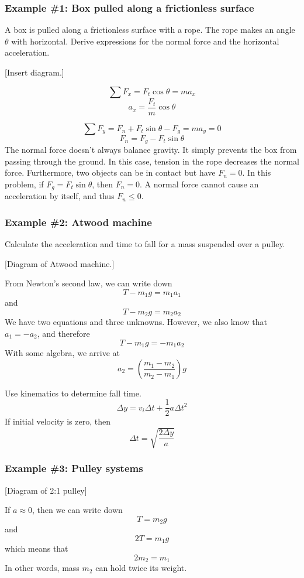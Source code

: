 \subsubsection*{Example \#1: Box pulled along a frictionless surface}
A box is pulled along a frictionless surface with a rope. The rope makes an angle $\theta$ with horizontal. Derive expressions for the normal force and the horizontal acceleration.

[Insert diagram.]

$$\sum F_x=F_t\cos\theta=ma_x$$
$$\boxed{a_x=\frac{F_t}{m}\cos\theta}$$

$$\sum F_y=F_n+F_t\sin\theta-F_g=ma_y=0$$
$$\boxed{F_n=F_g-F_t\sin\theta}$$
The normal force doesn't always balance gravity. It simply prevents the box from passing through the ground. In this case, tension in the rope decreases the normal force. Furthermore, two objects can be in contact but have $F_n=0$. In this problem, if $F_g=F_t\sin\theta$, then $F_n=0$. A normal force cannot cause an acceleration by itself, and thus $F_n\leq{0}$. 

\subsubsection*{Example \#2: Atwood machine}
Calculate the acceleration and time to fall for a mass suspended over a pulley.

[Diagram of Atwood machine.]
\vspace{5cm}


From Newton's second law, we can write down
$$T-m_1g = m_1 a_1$$
and
$$T-m_2g = m_2 a_2$$
We have two equations and three unknowns. However, we also know that $a_1=-a_2$, and therefore
$$T-m_1g = -m_1a_2$$
With some algebra, we arrive at
$$\boxed{a_2 = \left(\frac{m_1-m_2}{m_2-m_1}\right)g}$$

Use kinematics to determine fall time.
$$\Delta y = v_i \Delta t + \frac{1}{2}a\Delta t^2$$
If initial velocity is zero, then
$$\Delta t = \sqrt{\frac{2\Delta y}{a}}$$


\subsubsection*{Example \#3: Pulley systems}
[Diagram of 2:1 pulley]
\vspace{4cm}

If $a\approx 0$, then we can write down
$$T=m_2g$$
and
$$2T = m_1g$$
which means that
$$2m_2 = m_1$$
In other words, mass $m_2$ can hold twice its weight.

